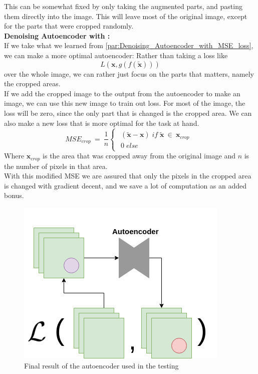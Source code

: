     This can be somewhat fixed by only taking the augmented parts, and pasting them directly into the image. This will leave most of the original image, except for the parts that were cropped randomly.\\
    
    \vspace{10px}
    \textbf{Denoising Autoencoder with :}\\
    If we take what we learned from \ref{par:Denoising_Autoencoder_with_MSE_loss}, we can make a more optimal autoencoder:
    Rather than taking a loss like     
    \begin{equation}
      L(\textbf{x},g(f(\widetilde{\textbf{x}})))
    \end{equation}
    over the whole image, we can rather just focus on the parts that matters, namely the cropped areas.\\
    
    If we add the cropped image to the output from the autoencoder to make an image, we can use this new image to train out loss.
    For most of the image, the loss will be zero, since the only part that is changed is the cropped area. 
    We can also make a new loss that is more optimal for the task at hand. 
    \begin{equation}
      MSE_{crop}\:=\: \frac{1}{n}
      \begin{cases}
          \begin{array}{lcl}
          (\widetilde{\textbf{x}}-\textbf{x}) \; if \; \widetilde{\textbf{x}} \: \in \: \textbf{x}_{crop} \\
          0 \; else
          \end{array}
      \end{cases}
    \end{equation}
    Where $\textbf{x}_{crop}$ is the area that was cropped away from the original image and $n$ is the number of pixels in that area.\\
    With this modified MSE we are assured that only the pixels in the cropped area is changed with gradient decent, and we save a lot of computation as an added bonus.
    
    
    \begin{figure}[ht!]
        \centering
        \includegraphics[scale=0.5]{background/figures/AE_for_inpainting.png}
        \caption{Final result of the autoencoder used in the testing}
    \end{figure}
    
